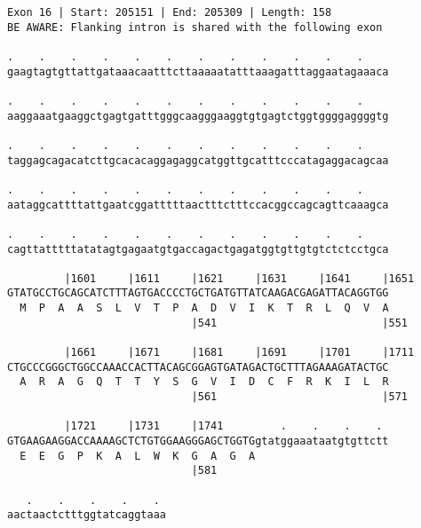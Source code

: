 \documentclass{article}
\begin{document}
\begin{Verbatim}[fontfamily=courier]
Exon 16 | Start: 205151 | End: 205309 | Length: 158
BE AWARE: Flanking intron is shared with the following exon

.    .    .    .    .    .    .    .    .    .    .    .    
gaagtagtgttattgataaacaatttcttaaaaatatttaaagatttaggaatagaaaca

.    .    .    .    .    .    .    .    .    .    .    .    
aaggaaatgaaggctgagtgatttgggcaagggaaggtgtgagtctggtggggaggggtg

.    .    .    .    .    .    .    .    .    .    .    .    
taggagcagacatcttgcacacaggagaggcatggttgcatttcccatagaggacagcaa

.    .    .    .    .    .    .    .    .    .    .    .    
aataggcattttattgaatcggatttttaactttctttccacggccagcagttcaaagca

.    .    .    .    .    .    .    .    .    .    .    .    
cagttatttttatatagtgagaatgtgaccagactgagatggtgttgtgtctctcctgca

         |1601     |1611     |1621     |1631     |1641     |1651
GTATGCCTGCAGCATCTTTAGTGACCCCTGCTGATGTTATCAAGACGAGATTACAGGTGG
  M  P  A  A  S  L  V  T  P  A  D  V  I  K  T  R  L  Q  V  A
                             |541                          |551

         |1661     |1671     |1681     |1691     |1701     |1711
CTGCCCGGGCTGGCCAAACCACTTACAGCGGAGTGATAGACTGCTTTAGAAAGATACTGC
  A  R  A  G  Q  T  T  Y  S  G  V  I  D  C  F  R  K  I  L  R
                             |561                          |571

         |1721     |1731     |1741         .    .    .    . 
GTGAAGAAGGACCAAAAGCTCTGTGGAAGGGAGCTGGTGgtatggaaataatgtgttctt
  E  E  G  P  K  A  L  W  K  G  A  G  A                     
                             |581                           

   .    .    .    .    . 
aactaactctttggtatcaggtaaa
\end{Verbatim}
\newpage
\end{document}
